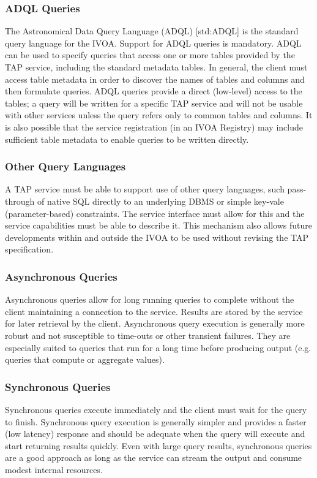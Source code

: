 \documentclass[11pt,a4paper]{ivoa}
\begin{document}
\subsubsection{ADQL Queries}
The Astronomical Data Query Language (ADQL) [std:ADQL] is the standard 
query language for the IVOA. Support for ADQL queries is mandatory. ADQL can be 
used to specify queries  that access one or more tables provided by the TAP 
service, including the standard metadata tables. In general, the client must 
access table metadata in order to discover the names of tables and columns and 
then formulate queries. ADQL queries provide a direct (low-level) access to the 
tables; a query will be written for a specific TAP service and will not be 
usable with other services unless the query refers only to common tables and 
columns. It is also possible that the service registration (in an IVOA Registry) 
may include sufficient table metadata to enable queries to be written directly.

\subsubsection{Other Query Languages}
A TAP service must be able to support use of other query languages, such
pass-through of native SQL directly to an underlying DBMS or simple key-vale 
(parameter-based) constraints. The service interface must allow for 
this and the service capabilities must be able to describe it. This mechanism 
also allows future developments within and outside the IVOA to be used without 
revising the TAP specification.

\subsubsection{Asynchronous Queries}
Asynchronous queries allow for long running queries to complete without 
the client maintaining a connection to the service. Results are stored by 
the service for later retrieval by the client. Asynchronous query 
execution is generally more robust and not susceptible to time-outs or other 
transient failures. They are especially suited to queries that run for a long 
time before producing output (e.g. queries that compute or aggregate values).

\subsubsection{Synchronous Queries}
Synchronous queries execute immediately  and the client must wait for the query 
to finish. Synchronous query execution is generally simpler and provides a 
faster (low latency) response and should be adequate when the query will execute 
and start returning results quickly. Even with large query results, synchronous 
queries are a good approach as long as the service can stream the output 
and consume modest internal resources. 
\end{document}
